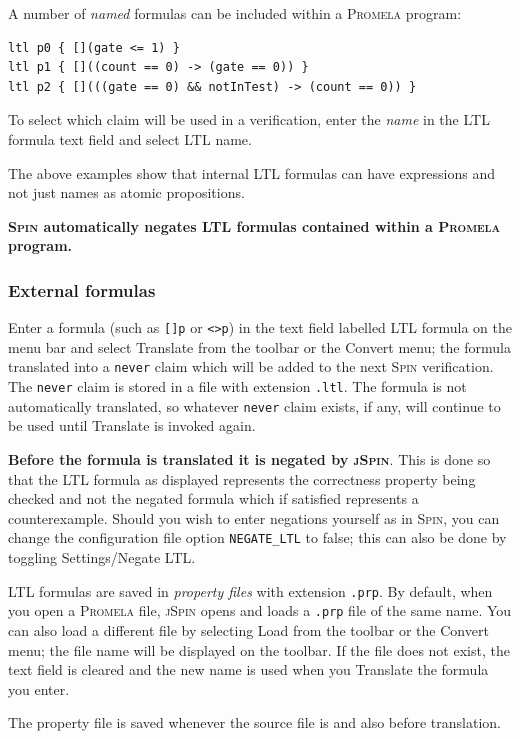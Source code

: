 \documentclass[11pt]{article}
\newcommand{\spn}{\textsc{Spin}}
\newcommand{\prm}{\textsc{Promela}}
\newcommand{\js}{\textsc{jSpin}}
\newcommand{\p}[1]{\texttt{#1}}
\newcommand{\bu}[1]{\textsf{#1}}
\begin{document}
A number of \emph{named} formulas can be included within a \prm{} program:
\begin{verbatim}
ltl p0 { [](gate <= 1) }
ltl p1 { []((count == 0) -> (gate == 0)) }
ltl p2 { [](((gate == 0) && notInTest) -> (count == 0)) }
\end{verbatim}
To select which claim will be used in a verification, enter the
\emph{name} in the \bu{LTL formula} text field and select \bu{LTL name}.

The above examples show that internal LTL formulas can have expressions
and not just names as atomic propositions.

\textbf{\spn{} automatically negates LTL formulas contained within a
\prm{} program.}

\subsubsection{External formulas}

Enter a formula (such as \p{[]p} or \p{<>p}) in the text field labelled
\bu{LTL formula} on the menu bar and select \bu{Translate} from the
toolbar or the \bu{Convert} menu; the formula translated into a
\p{never} claim which will be added to the next \spn{} verification. The
\p{never} claim is stored in a file with extension \p{.ltl}. The formula
is not automatically translated, so whatever \p{never} claim exists, if
any, will continue to be used until \bu{Translate} is invoked again.

\textbf{Before the formula is translated it is negated by \js}. This is
done so that the LTL formula as displayed represents the correctness
property being checked and not the negated formula which if satisfied
represents a counterexample. Should you wish to enter negations yourself
as in \spn{}, you can change the configuration file option
\p{NEGATE\_LTL} to false; this can also be done by toggling
\bu{Settings/Negate LTL}.

LTL formulas are saved in \emph{property files} with extension \p{.prp}.
By default, when you open a \prm{} file,
\js{} opens and loads a \p{.prp} file of the same name.
You can also load a different file by selecting \bu{Load} from
the toolbar or the \bu{Convert} menu;
the file name will be displayed on the toolbar.
If the file does not exist,
the text field is cleared and the new name is used when you \bu{Translate} the formula
you enter.

The property file is saved whenever the source file is
and also before translation.
\end{document}
